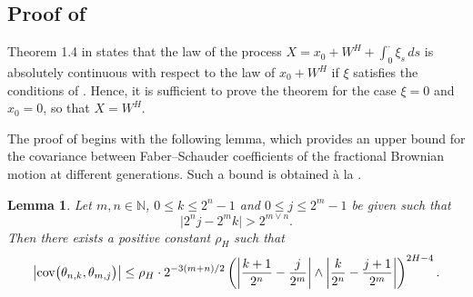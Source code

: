 \documentclass[12pt,reqno]{article}
\numberwithin{equation}{section}
\def\cov{\mbox{cov}}
\def\var{\mbox{var}}
\newtheorem{lemma}[theorem]{Lemma}
\theoremstyle{definition}
\def\cov{\hbox{\rm cov}}\def\var{\text{\rm Var}}
\newcommand{\bN}{\mathbb{N}}
\begin{document}
\subsection{Proof of }\label{Section Proof Rate}

Theorem 1.4 in \cite{HanSchiedGirsanov} states  that the law of the process $X=x_0+W^H+\int_0^\cdot\xi_s\,ds$ is absolutely continuous with respect to the law of $x_0+W^H$ if $\xi$ satisfies the conditions of .  Hence, it is sufficient to prove the theorem for the case $\xi=0$ and $x_0=0$, so that $X=W^H$. 

The proof of  begins with the following lemma, which provides an upper bound for the covariance between Faber--Schauder coefficients of the fractional Brownian motion at different generations. Such a bound is obtained \`{a} la \cite[Theorem 1]{Gladyshev}. 
\begin{lemma}\label{Lemma Faber Bound}
	Let $m,n \in \bN$, $0 \le k \le 2^n-1$ and $0 \le j \le 2^m-1$ be given such that 
	\begin{equation*}
		\big|2^n j - 2^m k\big| > 2^{m \vee n}.
	\end{equation*}
	Then there exists a positive constant $\rho_H$ such that
	\begin{equation}\label{eq Faber bound}
		\big|\cov\big(\theta_{n,k},\theta_{m,j}\big)\big| \le \rho_H \cdot 2^{-3(m+n)/2}\left(\left|\frac{k+1}{2^n}-\frac{j}{2^m}\right| \wedge \left|\frac{k}{2^n}-\frac{j+1}{2^m}\right|\right)^{2H-4}.
	\end{equation}
\end{lemma}
\end{document}
